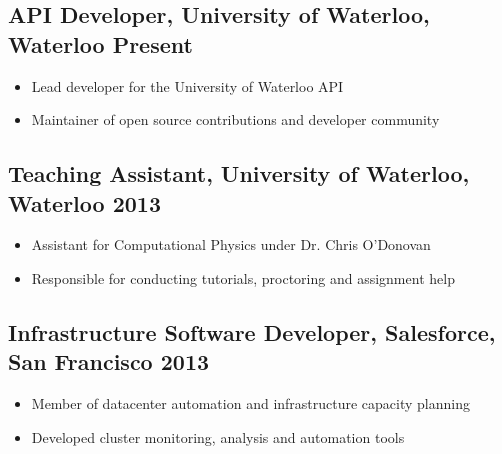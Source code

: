 \documentclass[10pt, oneside]{resume}                            %
\newcommand{\pspace}
{
  \vspace{-0.05 in}
}\pspace
\newcommand{\li}{-0.07 in}
\begin{document}
\pspace
  \subsection*{\normalsize{\bfseries API Developer}, University of Waterloo, Waterloo \hfill Present}
  \pspace
  \begin{itemize}
  \setlength{\itemsep}{2pt}
    \item Lead developer for the University of Waterloo API
    \vspace{\li}
    \item Maintainer of open source contributions and developer community
    \vspace{\li}
  \end{itemize}
  \vspace{-0.18 in}

  \subsection*{\normalsize{\bfseries Teaching Assistant}, University of Waterloo, Waterloo \hfill 2013}
  \pspace
  \begin{itemize}
  \setlength{\itemsep}{2pt}
    \item Assistant for Computational Physics under Dr. Chris O’Donovan
    \vspace{\li}
    \item Responsible for conducting tutorials, proctoring and assignment help
    \vspace{\li}
  \end{itemize}
  \vspace{-0.18 in}

  \subsection*{\normalsize{\bfseries Infrastructure Software Developer}, Salesforce, San Francisco \hfill 2013}
  \pspace
  \begin{itemize}
  \setlength{\itemsep}{2pt}
    \item Member of datacenter automation and infrastructure capacity planning
    \vspace{\li}
    \item Developed cluster monitoring, analysis and automation tools
    \vspace{\li}
  \end{itemize}
  \vspace{-0.18 in}
\end{document}
